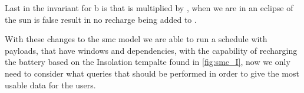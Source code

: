 Last in the invariant for b is  that is multiplied by , when we are in an eclipse of the sun  is false result in no recharge being added to .


With these changes to the \gls{smc} model we are able to run a schedule with payloads, that have windows and dependencies, with the capability of recharging the battery based on the Insolation tempalte found in \cref{fig:smc_I}, now we only need to consider what queries that should be performed in order to give the most usable data for the users.






